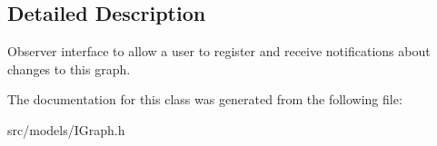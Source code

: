\subsection{Detailed Description}
Observer interface to allow a user to register and receive notifications about changes to this graph. 

The documentation for this class was generated from the following file\+:\begin{DoxyCompactItemize}
\item 
src/models/I\+Graph.\+h\end{DoxyCompactItemize}
